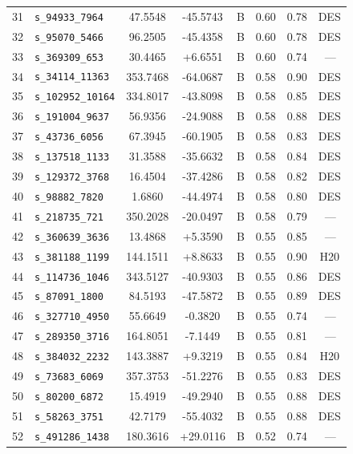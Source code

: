 \begin{longtable}{rlcccccc}
31 & \texttt{s\_94933\_7964} & 47.5548 & -45.5743 & B & 0.60 & 0.78 & DES \\
32 & \texttt{s\_95070\_5466} & 96.2505 & -45.4358 & B & 0.60 & 0.78 & DES \\
33 & \texttt{s\_369309\_653} & 30.4465 & +6.6551 & B & 0.60 & 0.74 & \,--- \\
34 & \texttt{s\_34114\_11363} & 353.7468 & -64.0687 & B & 0.58 & 0.90 & DES \\
35 & \texttt{s\_102952\_10164} & 334.8017 & -43.8098 & B & 0.58 & 0.85 & DES \\
36 & \texttt{s\_191004\_9637} & 56.9356 & -24.9088 & B & 0.58 & 0.88 & DES \\
37 & \texttt{s\_43736\_6056} & 67.3945 & -60.1905 & B & 0.58 & 0.83 & DES \\
38 & \texttt{s\_137518\_1133} & 31.3588 & -35.6632 & B & 0.58 & 0.84 & DES \\
39 & \texttt{s\_129372\_3768} & 16.4504 & -37.4286 & B & 0.58 & 0.82 & DES \\
40 & \texttt{s\_98882\_7820} & 1.6860 & -44.4974 & B & 0.58 & 0.80 & DES \\
41 & \texttt{s\_218735\_721} & 350.2028 & -20.0497 & B & 0.58 & 0.79 & \,--- \\
42 & \texttt{s\_360639\_3636} & 13.4868 & +5.3590 & B & 0.55 & 0.85 & \,--- \\
43 & \texttt{s\_381188\_1199} & 144.1511 & +8.8633 & B & 0.55 & 0.90 & H20 \\
44 & \texttt{s\_114736\_1046} & 343.5127 & -40.9303 & B & 0.55 & 0.86 & DES \\
45 & \texttt{s\_87091\_1800} & 84.5193 & -47.5872 & B & 0.55 & 0.89 & DES \\
46 & \texttt{s\_327710\_4950} & 55.6649 & -0.3820 & B & 0.55 & 0.74 & \,--- \\
47 & \texttt{s\_289350\_3716} & 164.8051 & -7.1449 & B & 0.55 & 0.81 & \,--- \\
48 & \texttt{s\_384032\_2232} & 143.3887 & +9.3219 & B & 0.55 & 0.84 & H20 \\
49 & \texttt{s\_73683\_6069} & 357.3753 & -51.2276 & B & 0.55 & 0.83 & DES \\
50 & \texttt{s\_80200\_6872} & 15.4919 & -49.2940 & B & 0.55 & 0.88 & DES \\
51 & \texttt{s\_58263\_3751} & 42.7179 & -55.4032 & B & 0.55 & 0.88 & DES \\
52 & \texttt{s\_491286\_1438} & 180.3616 & +29.0116 & B & 0.52 & 0.74 & \,--- \\

\end{longtable}
